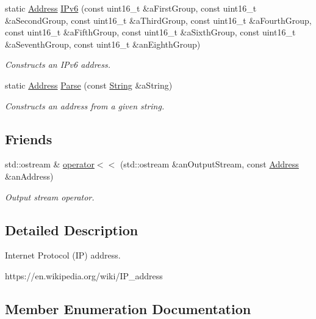 \begin{DoxyCompactItemize}
static \hyperlink{classlibrary_1_1io_1_1ip_1_1_address}{Address} \hyperlink{classlibrary_1_1io_1_1ip_1_1_address_aa89db4931003a16ebfaea376308164ab}{I\+Pv6} (const uint16\+\_\+t \&a\+First\+Group, const uint16\+\_\+t \&a\+Second\+Group, const uint16\+\_\+t \&a\+Third\+Group, const uint16\+\_\+t \&a\+Fourth\+Group, const uint16\+\_\+t \&a\+Fifth\+Group, const uint16\+\_\+t \&a\+Sixth\+Group, const uint16\+\_\+t \&a\+Seventh\+Group, const uint16\+\_\+t \&an\+Eighth\+Group)
\begin{DoxyCompactList}\small\item\em Constructs an I\+Pv6 address. \end{DoxyCompactList}\item 
static \hyperlink{classlibrary_1_1io_1_1ip_1_1_address}{Address} \hyperlink{classlibrary_1_1io_1_1ip_1_1_address_af8ab0e365de3c00109b456ee94e2590b}{Parse} (const \hyperlink{namespacelibrary_1_1io_1_1ip_a2ac70ed8dfa9969304e09cead6a39459}{String} \&a\+String)
\begin{DoxyCompactList}\small\item\em Constructs an address from a given string. \end{DoxyCompactList}\end{DoxyCompactItemize}
\subsection*{Friends}
\begin{DoxyCompactItemize}
\item 
std\+::ostream \& \hyperlink{classlibrary_1_1io_1_1ip_1_1_address_acb0766764bb037acde8e0acdfdecadd0}{operator$<$$<$} (std\+::ostream \&an\+Output\+Stream, const \hyperlink{classlibrary_1_1io_1_1ip_1_1_address}{Address} \&an\+Address)
\begin{DoxyCompactList}\small\item\em Output stream operator. \end{DoxyCompactList}\end{DoxyCompactItemize}


\subsection{Detailed Description}
Internet Protocol (IP) address. 

https\+://en.wikipedia.\+org/wiki/\+I\+P\+\_\+address 

\subsection{Member Enumeration Documentation}
\mbox{\label{classlibrary_1_1io_1_1ip_1_1_address_a1a4f284eb6f5f52b67f2e34a93f225af}} 
